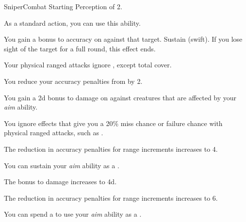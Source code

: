     \begin{feat}{Sniper}{Combat}
        \featpre Starting Perception of 2.
        \featben

         As a standard action, you can use this ability.
        \begin{ability}
            \begin{spelltargetinginfo}
            \end{spelltargetinginfo}
            \begin{spelleffects}
                \spelleffect You gain a  bonus to accuracy on  against that target.
                \spelldur Sustain (swift). If you lose sight of the target for a full round, this effect ends.
            \end{spelleffects}
        \end{ability}

         Your physical ranged attacks ignore , except total cover.

         You reduce your accuracy penalties from  by 2.

         You gain a \plus2d bonus to damage on  against \unaware creatures that are affected by your \textit{aim} ability.

         You ignore effects that give you a 20\% miss chance or failure chance with physical ranged attacks, such as .

         The reduction in accuracy penalties for range increments increases to 4.

         You can sustain your \textit{aim} ability as a .

         The bonus to damage increases to \plus4d.

         The reduction in accuracy penalties for range increments increases to 6.

         You can spend a  to use your \textit{aim} ability as a .
    \end{feat}

